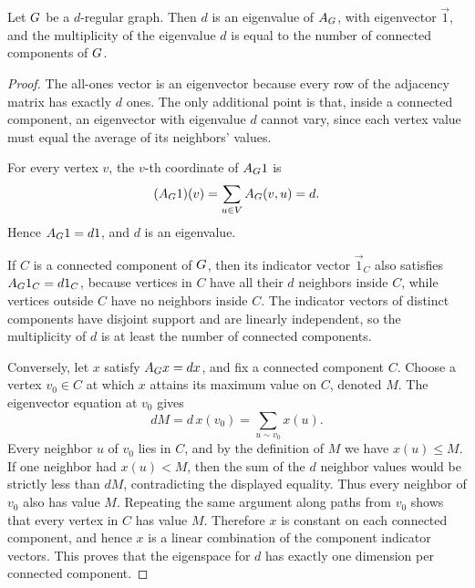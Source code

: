 \begin{proposition}
	\label{prop:regular-trivial-adjacency-eigenvalue}
	Let \(G\) be a \(d\)-regular graph. Then \(d\) is an eigenvalue of \(A_{G}\), with eigenvector \(\vec{1}\), and the multiplicity of the eigenvalue \(d\) is equal to the number of connected components of \(G\).
\end{proposition}

\begin{proof}
	The all-ones vector is an eigenvector because every row of the adjacency matrix has exactly \(d\) ones. The only additional point is that, inside a connected component, an eigenvector with eigenvalue \(d\) cannot vary, since each vertex value must equal the average of its neighbors' values.

	For every vertex \(v\), the \(v\)-th coordinate of \(A_{G}1\) is
	\begin{equation}
		(A_{G}1)(v)=\sum_{u\in V}A_{G}(v,u)=d.
	\end{equation}
	Hence \(A_{G}1=d1\), and \(d\) is an eigenvalue.

	If \(C\) is a connected component of \(G\), then its indicator vector \(\vec{1}_C\) also satisfies \(A_{G}1_C=d1_C\), because vertices in \(C\) have all their \(d\) neighbors inside \(C\), while vertices outside \(C\) have no neighbors inside \(C\). The indicator vectors of distinct components have disjoint support and are linearly independent, so the multiplicity of \(d\) is at least the number of connected components.

	Conversely, let \(x\) satisfy \(A_{G}x=dx\), and fix a connected component \(C\). Choose a vertex \(v_0\in C\) at which \(x\) attains its maximum value on \(C\), denoted \(M\). The eigenvector equation at \(v_0\) gives
	\begin{equation}
		dM=d\,x(v_0)=\sum_{u\sim v_0}x(u).
	\end{equation}
	Every neighbor \(u\) of \(v_0\) lies in \(C\), and by the definition of \(M\) we have \(x(u)\leq M\). If one neighbor had \(x(u)<M\), then the sum of the \(d\) neighbor values would be strictly less than \(dM\), contradicting the displayed equality. Thus every neighbor of \(v_0\) also has value \(M\). Repeating the same argument along paths from \(v_0\) shows that every vertex in \(C\) has value \(M\). Therefore \(x\) is constant on each connected component, and hence \(x\) is a linear combination of the component indicator vectors. This proves that the eigenspace for \(d\) has exactly one dimension per connected component.
\end{proof}

